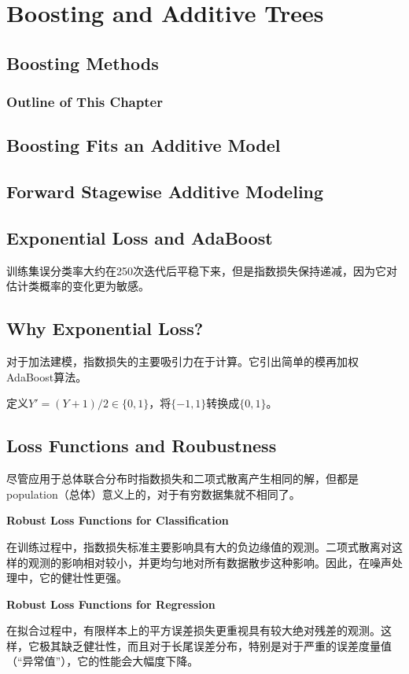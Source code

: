 \chapter{Boosting and Additive Trees}
    \section{Boosting Methods}
        \subsection{Outline of This Chapter}
    \section{Boosting Fits an Additive Model}
    \section{Forward Stagewise Additive Modeling}
    \section{Exponential Loss and AdaBoost}
        训练集误分类率大约在250次迭代后平稳下来，但是指数损失保持递减，因为它对估计类概率的变化更为敏感。
    \section{Why Exponential Loss?}
        对于加法建模，指数损失的主要吸引力在于计算。它引出简单的模再加权AdaBoost算法。

        定义$Y' = (Y + 1)/2 \in \{ 0,1\}$，将$\{-1, 1\}$转换成$\{0, 1\}$。

    \section{Loss Functions and Roubustness}
        尽管应用于总体联合分布时指数损失和二项式散离产生相同的解，但都是population（总体）意义上的，对于有穷数据集就不相同了。

        {\color{blue} \bf{Robust Loss Functions for Classification}}

        在训练过程中，指数损失标准主要影响具有大的负边缘值的观测。二项式散离对这样的观测的影响相对较小，并更均匀地对所有数据散步这种影响。因此，在噪声处理中，它的健壮性更强。

        {\color{blue} \bf{Robust Loss Functions for Regression}}

        在拟合过程中，有限样本上的平方误差损失更重视具有较大绝对残差的观测。这样，它极其缺乏健壮性，而且对于长尾误差分布，特别是对于严重的误差度量值（“异常值”），它的性能会大幅度下降。
